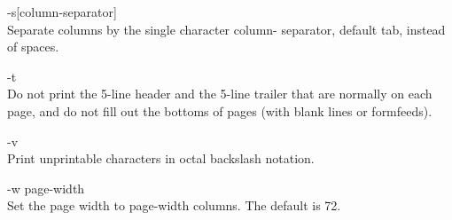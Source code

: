 \begin{description}
       -s[column-separator] \\
              Separate  columns  by  the single character column-
              separator, default tab, instead of spaces.

       -t      \\
              Do not print  the  5-line  header  and  the  5-line
              trailer  that are normally on each page, and do not
              fill out the bottoms of pages (with blank lines  or
              formfeeds).

       -v      \\
              Print  unprintable  characters  in  octal backslash notation.

       -w page-width \\
              Set the page  width  to  page-width  columns.   The
              default is 72.
\end{description}

